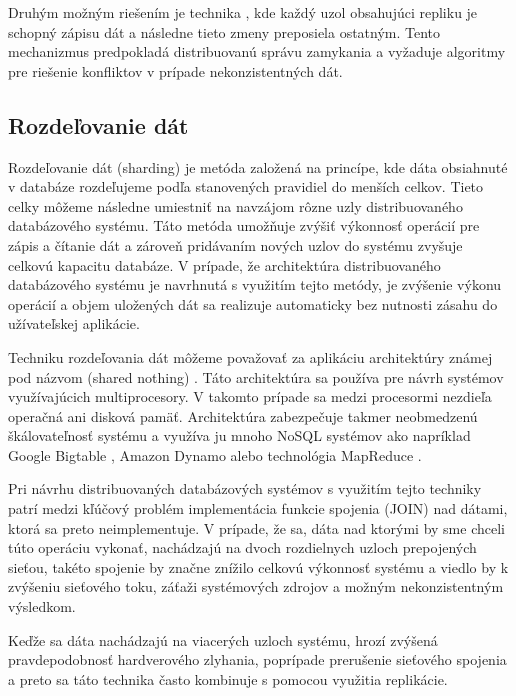 \documentclass[11pt,twoside,a4paper]{book}
\begin{document}
Druhým možným riešením je technika , kde každý uzol obsahujúci repliku je schopný zápisu dát a následne tieto zmeny preposiela ostatným. Tento mechanizmus predpokladá distribuovanú správu zamykania a vyžaduje algoritmy pre riešenie konfliktov v prípade nekonzistentných dát.


\subsection{Rozdeľovanie dát}

Rozdeľovanie dát (sharding) je metóda založená na princípe, kde dáta obsiahnuté v databáze rozdeľujeme podľa stanovených pravidiel do menších celkov. Tieto celky môžeme následne umiestniť na navzájom rôzne uzly distribuovaného databázového systému. Táto metóda umožňuje zvýšiť výkonnosť operácií pre zápis a čítanie dát a zároveň pridávaním nových uzlov do systému zvyšuje celkovú kapacitu databáze. V prípade, že
architektúra distribuovaného databázového systému je navrhnutá s využitím tejto metódy, je zvýšenie výkonu operácií a objem uložených dát sa realizuje automaticky bez nutnosti zásahu do užívateľskej aplikácie. 

Techniku rozdeľovania dát môžeme považovať za aplikáciu architektúry známej pod názvom  (shared nothing) \cite{stonebraker1986case}. Táto architektúra sa používa pre návrh systémov využívajúcich multiprocesory. V takomto prípade sa medzi procesormi nezdieľa operačná ani disková pamäť. Architektúra zabezpečuje takmer neobmedzenú škálovateľnosť systému a využíva ju mnoho NoSQL systémov ako napríklad Google Bigtable \cite{chang2008bigtable}, Amazon Dynamo \cite{decandia2007dynamo} alebo technológia MapReduce \cite{dean2008mapreduce}.

Pri návrhu distribuovaných databázových systémov s využitím tejto techniky patrí medzi kľúčový problém implementácia funkcie spojenia (JOIN) nad dátami, ktorá sa preto neimplementuje. V prípade, že sa, dáta nad ktorými by sme chceli túto operáciu vykonať, nachádzajú na dvoch rozdielnych uzloch prepojených sieťou, takéto spojenie by značne znížilo celkovú výkonnosť systému a viedlo by k zvýšeniu sieťového toku, záťaži systémových zdrojov a možným nekonzistentným výsledkom.

Keďže sa dáta nachádzajú na viacerých uzloch systému, hrozí zvýšená pravdepodobnosť hardverového zlyhania, poprípade prerušenie sieťového spojenia a preto sa táto technika často kombinuje s pomocou využitia replikácie.
\end{document}

